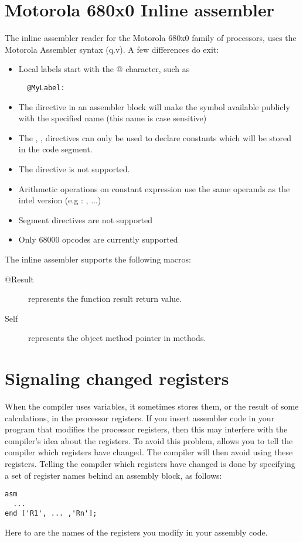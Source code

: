 \section{Motorola 680x0 Inline assembler}

The inline assembler reader for the Motorola 680x0 family of processors,
uses the Motorola Assembler syntax (q.v). A few differences do exit:

\begin{itemize}
\item Local labels start with the @ character, such as
\begin{verbatim}
  @MyLabel:
\end{verbatim}
\item The  directive in an assembler block will
make the symbol available publicly with the specified name
(this name is case sensitive)
\item The , ,  directives can only
be used to declare constants which will be stored in the
code segment.
\item The  directive is not supported.
\item Arithmetic operations on constant expression use the same
operands as the intel version (e.g : ,  ...)
\item Segment directives are not supported
\item Only 68000 opcodes are currently supported
\end{itemize}

The inline assembler supports the following macros:
\begin{description}
\item [@Result] represents the function result return value.
\item [Self] represents the object method pointer in methods.
\end{description}



\section{Signaling changed registers}
\label{se:RegChanges}
When the compiler uses variables, it sometimes stores them, or the result of
some calculations, in the processor registers. If you insert assembler code
in your program that modifies the processor registers, then this may
interfere with the compiler's idea about the registers. To avoid this
problem, \fpc allows you to tell the compiler which registers have changed.
The compiler will then avoid using these registers. Telling the compiler
which registers have changed is done by specifying a set of register names
behind an assembly block, as follows:
\begin{verbatim}
asm
  ...
end ['R1', ... ,'Rn'];
\end{verbatim}
Here  to  are the names of the registers you
modify in your assembly code.

